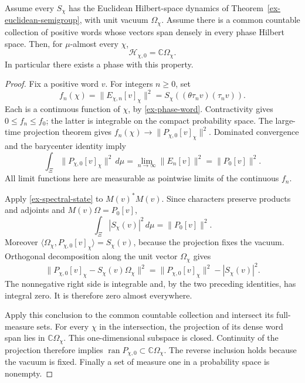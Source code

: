 \begin{theorem}
\label{ex-pure-ground}
Assume every \(S_\chi\) has the Euclidean Hilbert-space dynamics of
Theorem~\ref{ex-euclidean-semigroup}, with unit vacuum \(\Omega_\chi\).
Assume there is a common countable collection of positive words whose
vectors span densely in every phase Hilbert space. Then, for
\(\mu\)-almost every \(\chi\),
\[
 \mathcal H_{\chi,0}=\mathbb C\Omega_\chi.
\]
In particular there exists a phase with this property.
\end{theorem}
\begin{proof}
Fix a positive word \(v\). For integers \(n\ge0\), set
\[
 f_n(\chi)=\|E_{\chi,n}[v]_\chi\|^2
 =S_\chi((\theta\tau_nv)(\tau_nv)).
\]
Each is a continuous function of \(\chi\), by
\eqref{ex-phase-word}. Contractivity gives \(0\le f_n\le f_0\);
the latter is integrable on the compact probability space. The
large-time projection theorem gives
\(f_n(\chi)\to\|P_{\chi,0}[v]_\chi\|^2\).
Dominated convergence and the barycenter identity imply
\begin{equation}\label{ex-phase-ground-average}
 \int_\Xi\|P_{\chi,0}[v]_\chi\|^2\,d\mu
 =\lim_{n\to\infty}\|E_n[v]\|^2=\|P_0[v]\|^2.
\end{equation}
All limit functions here are measurable as pointwise limits of the
continuous \(f_n\).

Apply \eqref{ex-spectral-state} to \(M(v)^*M(v)\). Since characters
preserve products and adjoints and \(M(v)\Omega=P_0[v]\),
\[
 \int_\Xi|S_\chi(v)|^2\,d\mu=\|P_0[v]\|^2.
\]
Moreover \(\langle\Omega_\chi,P_{\chi,0}[v]_\chi\rangle=S_\chi(v)\),
because the projection fixes the vacuum. Orthogonal decomposition along
the unit vector \(\Omega_\chi\) gives
\[
 \|P_{\chi,0}[v]_\chi-S_\chi(v)\Omega_\chi\|^2
 =\|P_{\chi,0}[v]_\chi\|^2-|S_\chi(v)|^2.
\]
The nonnegative right side is integrable and, by the two preceding
identities, has integral zero. It is therefore zero almost everywhere.

Apply this conclusion to the common countable collection and intersect
its full-measure sets. For every \(\chi\) in the intersection, the
projection of its dense word span lies in \(\mathbb C\Omega_\chi\).
This one-dimensional subspace is closed. Continuity of the projection
therefore implies \(\operatorname{ran}P_{\chi,0}\subset
\mathbb C\Omega_\chi\). The reverse inclusion holds because the vacuum
is fixed. Finally a set of measure one in a probability space is nonempty.
\end{proof}

